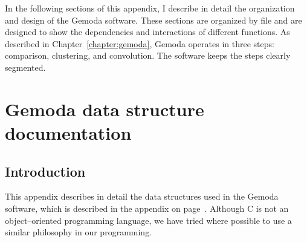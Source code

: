     In the following sections of this appendix, I describe in detail
    the organization and design of the Gemoda software.  These
    sections are organized by file and are designed to show the
    dependencies and interactions of different functions.  As
    described in Chapter~\vref{chapter:gemoda}, Gemoda operates in
    three steps: comparison, clustering, and convolution.  The
    software keeps the steps clearly segmented.

\begin{singlespace}


%



















\end{singlespace}

\chapter{Gemoda data structure documentation}\label{chapter:gstructs}

\section{Introduction}
This appendix describes in detail the data structures used in the
Gemoda software, which is described in the appendix on
page~\pageref{chapter:gfiles}.  Although C is not an
object--oriented programming language, we have tried where possible
to use a similar philosophy in our programming.

\begin{singlespace}












\end{singlespace}
